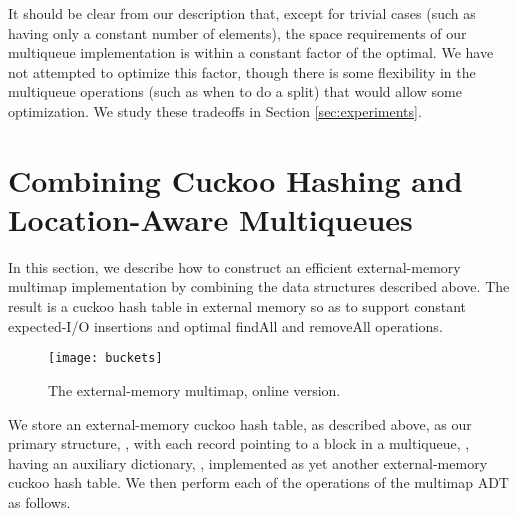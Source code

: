 \documentclass[11pt,letterpaper]{article}
\begin{document}
It should be clear from our description that, except for trivial cases
(such as having only a constant number of elements), the space
requirements of our multiqueue implementation is within a constant
factor of the optimal.  We have not attempted to optimize this factor, though
there is some flexibility in the multiqueue operations (such as when to do a split)
that would allow some optimization.
We study these tradeoffs in Section \ref{sec:experiments}.



\section{Combining Cuckoo Hashing and Location-Aware Multiqueues}
\label{sec:combine}
In this section, we describe how to construct an efficient
external-memory multimap implementation by combining the 
data structures described above.
The result is 
a cuckoo hash table in external memory so as to support constant
expected-I/O insertions and optimal findAll and removeAll
operations.

\begin{figure*}[!thb]
\begin{center}
\texttt{[image: buckets]}
\caption{The external-memory multimap, online version.}
\label{fig:buckets}
\end{center}
\end{figure*}

We store an external-memory cuckoo hash table, as
described above, as our primary structure, ,
with each record pointing to a block
in a multiqueue, , having an auxiliary dictionary, ,
implemented as yet another external-memory cuckoo hash table.
We then perform each
of the operations of the multimap ADT as follows.
\end{document}
